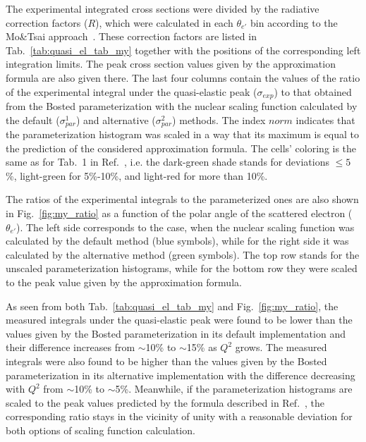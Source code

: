 
The experimental integrated cross sections were divided by the radiative correction factors ($R$), which were calculated in each $\theta_{e'}$ bin according to the Mo\&Tsai approach~\cite{Mo:1968cg}. These correction factors are listed in Tab.~\ref{tab:quasi_el_tab_my} together with the positions of the corresponding left integration limits. The peak cross section values given by the approximation formula are also given there. The last four columns contain the values of the ratio of the experimental integral under the quasi-elastic peak ($\sigma_{exp}$) to that obtained from the Bosted parameterization with the nuclear scaling function calculated by the default ($\sigma_{par}^{1}$) and alternative ($\sigma_{par}^{2}$) methods. The index $norm$ indicates that the parameterization histogram was scaled in a way that its maximum is equal to the prediction of the considered approximation formula. The cells' coloring is the same as for Tab.~1 in Ref.~\cite{note_QE_peak}, i.e. the dark-green shade stands for deviations $\leq 5$\%, light-green for 5\%-10\%, and light-red for more than 10\%.







The ratios of the experimental integrals to the parameterized ones are also shown in Fig.~\ref{fig:my_ratio} as a function of the polar angle of the scattered electron ($\theta_{e'}$). The left side corresponds to the case, when the nuclear scaling function was calculated by the default method (blue symbols), while for the right side it was calculated by the alternative method (green symbols). The top row stands for the unscaled parameterization histograms, while for the bottom row they were scaled to the peak value given by the approximation formula. 



As seen from both Tab.~\ref{tab:quasi_el_tab_my} and Fig.~\ref{fig:my_ratio}, the measured integrals under the quasi-elastic peak were found to be lower than the values given by the Bosted parameterization in its default implementation and their difference increases from $\sim$10\% to $\sim$15\% as $Q^{2}$ grows. The measured integrals were also found to be higher than the values given by the Bosted parameterization in its alternative implementation with the difference decreasing with $Q^{2}$ from $\sim$10\% to $\sim$5\%. Meanwhile, if the parameterization histograms are scaled to the peak values predicted by the formula described in Ref.~\cite{note_QE_peak}, the corresponding ratio stays in the vicinity of unity with a reasonable deviation for both options of scaling function calculation. 

